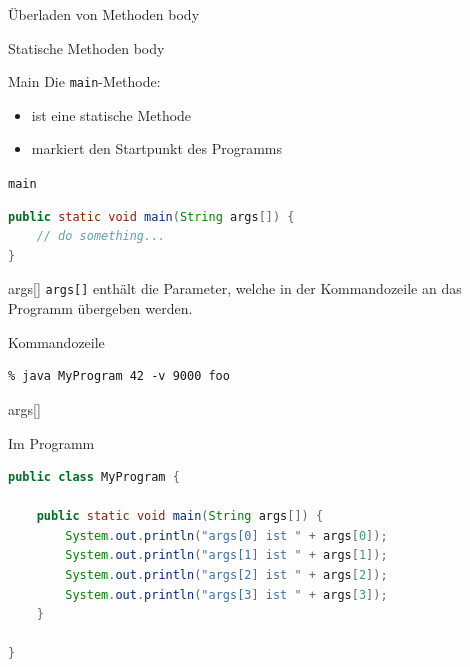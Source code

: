 \documentclass[18pt]{beamer}
\begin{document}
\begin{frame}{Überladen von Methoden}
    body
\end{frame}

\begin{frame}{Statische Methoden}
    body
\end{frame}

\begin{frame}[fragile]{Main}
    Die \texttt{main}-Methode:
    \begin{itemize}
        \item ist eine statische Methode
        \item markiert den Startpunkt des Programms
    \end{itemize}

    \begin{exampleblock}{\texttt{main}}
        \begin{lstlisting}[language=Java]
public static void main(String args[]) {
    // do something...
}
        \end{lstlisting}

    \end{exampleblock}


\end{frame}

\begin{frame}[fragile]{args[]}
    \texttt{args[]} enthält die Parameter, welche in der Kommandozeile an das Programm übergeben werden.
    \pause
    \begin{exampleblock}{Kommandozeile}
        \begin{lstlisting}
% java MyProgram 42 -v 9000 foo
        \end{lstlisting}
    \end{exampleblock}

\end{frame}

\begin{frame}[fragile]{args[]}

    \begin{exampleblock}{Im Programm}
        \begin{lstlisting}[language=Java]
public class MyProgram {

    public static void main(String args[]) {
        System.out.println("args[0] ist " + args[0]);
        System.out.println("args[1] ist " + args[1]);
        System.out.println("args[2] ist " + args[2]);
        System.out.println("args[3] ist " + args[3]);
    }

}
        \end{lstlisting}
    \end{exampleblock}

\end{frame}
\end{document}
